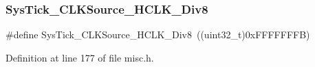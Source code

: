 \subsubsection{\texorpdfstring{Sys\+Tick\+\_\+\+C\+L\+K\+Source\+\_\+\+H\+C\+L\+K\+\_\+\+Div8}{SysTick\_CLKSource\_HCLK\_Div8}}
{\footnotesize\ttfamily \#define Sys\+Tick\+\_\+\+C\+L\+K\+Source\+\_\+\+H\+C\+L\+K\+\_\+\+Div8~((uint32\+\_\+t)0x\+F\+F\+F\+F\+F\+F\+F\+B)}



Definition at line 177 of file misc.\+h.

